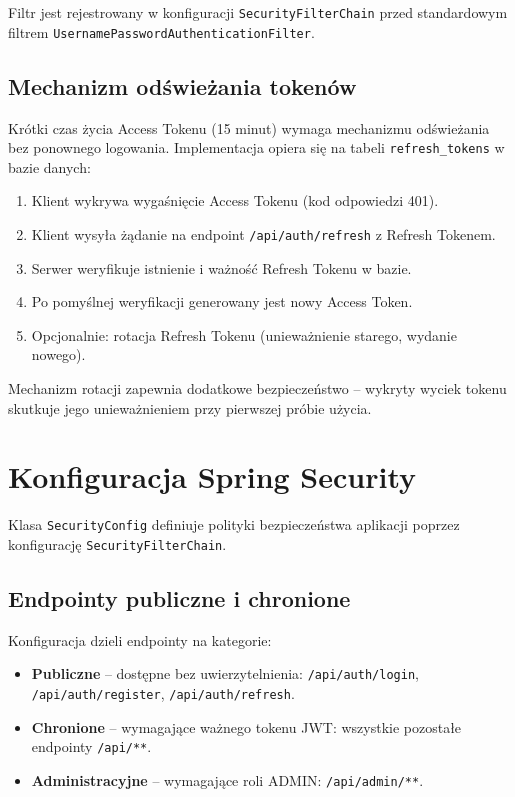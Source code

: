 ﻿\documentclass[a4paper,twoside,11pt]{mwrep}
\theoremstyle{plain} \newtheorem{thm}{Twierdzenie}
\theoremstyle{plain} \newtheorem{lem}{Lemat}
\theoremstyle{definition} \newtheorem{defn}{Definicja}
\theoremstyle{remark} \newtheorem*{rem}{Wniosek}
\begin{document}
Filtr jest rejestrowany w konfiguracji \texttt{SecurityFilterChain} przed standardowym filtrem \texttt{UsernamePasswordAuthenticationFilter}.

\subsection{Mechanizm odświeżania tokenów}

Krótki czas życia Access Tokenu (15 minut) wymaga mechanizmu odświeżania bez ponownego logowania. Implementacja opiera się na tabeli \texttt{refresh\_tokens} w bazie danych:

\begin{enumerate}
    \item Klient wykrywa wygaśnięcie Access Tokenu (kod odpowiedzi 401).
    \item Klient wysyła żądanie na endpoint \texttt{/api/auth/refresh} z Refresh Tokenem.
    \item Serwer weryfikuje istnienie i ważność Refresh Tokenu w bazie.
    \item Po pomyślnej weryfikacji generowany jest nowy Access Token.
    \item Opcjonalnie: rotacja Refresh Tokenu (unieważnienie starego, wydanie nowego).
\end{enumerate}

Mechanizm rotacji zapewnia dodatkowe bezpieczeństwo -- wykryty wyciek tokenu skutkuje jego unieważnieniem przy pierwszej próbie użycia.

\section{Konfiguracja Spring Security}

Klasa \texttt{SecurityConfig} definiuje polityki bezpieczeństwa aplikacji poprzez konfigurację \texttt{SecurityFilterChain}.

\subsection{Endpointy publiczne i chronione}

Konfiguracja dzieli endpointy na kategorie:
\begin{itemize}
    \item \textbf{Publiczne} -- dostępne bez uwierzytelnienia: \texttt{/api/auth/login}, \texttt{/api/auth/register}, \texttt{/api/auth/refresh}.
    \item \textbf{Chronione} -- wymagające ważnego tokenu JWT: wszystkie pozostałe endpointy \texttt{/api/**}.
    \item \textbf{Administracyjne} -- wymagające roli ADMIN: \texttt{/api/admin/**}.
\end{itemize}
\end{document}
